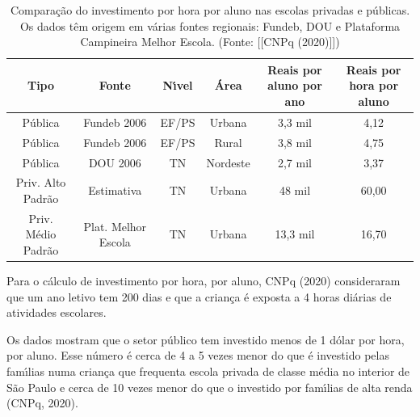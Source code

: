\documentclass[
12pt,		%
openright,	%
twoside,  %
a4paper,			%
chapter=TITLE,		%
english,			%
french,				%
spanish,			%
brazil				%
]{USPSC-classe/USPSC}
\begin{document}
\begin{table}[htb]
\tiny
\caption{\label{489af209007e651b007535a7733d5ca117c5b310}Compara\c{c}\~ao do investimento por hora por aluno nas escolas privadas e p\'ublicas. Os dados t\^em origem em v\'arias fontes regionais: Fundeb, DOU e Plataforma Campineira Melhor Escola. (Fonte:  [[CNPq (2020)]])}

\centering
\begin{tabular}{|c|c|c|c|c|c|}
\hline
Tipo  &  Fonte  &  N\'{\i}vel  &  \'Area  &  Reais por aluno por ano  &  Reais por hora por aluno \\
\hline
P\'ublica  &  Fundeb 2006  &  EF/PS  &  Urbana  &  3,3 mil  &  4,12 \\
P\'ublica  &  Fundeb 2006  &  EF/PS  &  Rural  &  3,8 mil  &  4,75 \\
P\'ublica  &  DOU 2006  &  TN  &  Nordeste  &  2,7 mil  &  3,37 \\
Priv. Alto Padr\~ao  &  Estimativa  &  TN  &  Urbana  &  48 mil  &  60,00 \\
Priv. M\'edio Padr\~ao  &  Plat. Melhor Escola  &  TN  &  Urbana  &  13,3 mil  &  16,70 \\
\hline
\end{tabular}
\end{table}


Para o c\'alculo de investimento por hora, por aluno,  CNPq (2020) consideraram que um ano letivo tem 200 dias e que a crian\c{c}a \'e exposta a 4 horas di\'arias de atividades escolares.

















Os dados mostram que o setor p\'ublico tem investido menos de 1 d\'olar por hora, por aluno. Esse n\'umero \'e cerca de 4 a 5 vezes menor do que \'e investido pelas fam\'{\i}lias numa crian\c{c}a que frequenta escola privada de classe m\'edia no interior de S\~ao Paulo e cerca de 10 vezes menor do que o investido por fam\'{\i}lias de alta renda  (CNPq, 2020).
\end{document}
